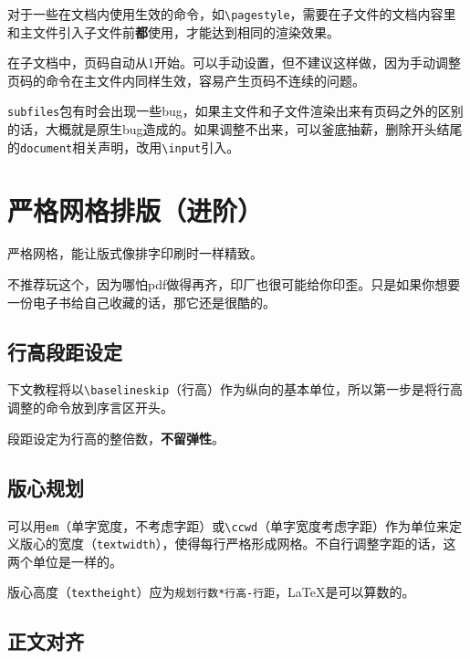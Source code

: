 \documentclass[10pt,openany]{book}
\begin{document}
\begin{sloppypar}
对于一些在文档内使用生效的命令，如\texttt{\textbackslash{}pagestyle}，需要在子文件的文档内容里和主文件引入子文件前\textbf{都}使用，才能达到相同的渲染效果。

在子文档中，页码自动从1开始。可以手动设置，但不建议这样做，因为手动调整页码的命令在主文件内同样生效，容易产生页码不连续的问题。

\texttt{subfiles}包有时会出现一些bug，如果主文件和子文件渲染出来有页码之外的区别的话，大概就是原生bug造成的。如果调整不出来，可以釜底抽薪，删除开头结尾的\texttt{document}相关声明，改用\texttt{\textbackslash{}input}引入。

\chapter{严格网格排版（进阶）}

严格网格，能让版式像排字印刷时一样精致。

不推荐玩这个，因为哪怕pdf做得再齐，印厂也很可能给你印歪。只是如果你想要一份电子书给自己收藏的话，那它还是很酷的。

\section{行高段距设定}

下文教程将以\texttt{\textbackslash{}baselineskip}（行高）作为纵向的基本单位，所以第一步是将行高调整的命令放到序言区开头。



段距设定为行高的整倍数，\textbf{不留弹性}。



\section{版心规划}

可以用\texttt{em}（单字宽度，不考虑字距）或\texttt{\textbackslash{}ccwd}（单字宽度考虑字距）作为单位来定义版心的宽度（\texttt{textwidth}），使得每行严格形成网格。不自行调整字距的话，这两个单位是一样的。

版心高度（\texttt{textheight}）应为\texttt{规划行数*行高-行距}，{\LaTeX}是可以算数的。



\section{正文对齐}


\end{sloppypar}
\end{document}
